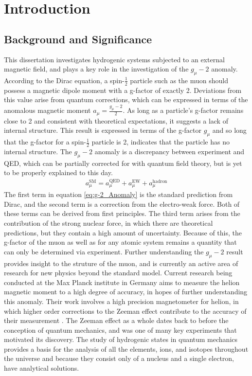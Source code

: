 \chapter{Introduction}
    \section{Background and Significance}
        This dissertation investigates hydrogenic systems subjected to an external magnetic field, and plays a key role in the investigation of the $g_\mu - 2$ anomaly. According to the Dirac equation, a spin-$\frac{1}{2}$ particle such as the muon should possess a magnetic dipole moment with a g-factor of exactly 2. Deviations from this value arise from quantum corrections, which can be expressed in terms of the anomalous magnetic moment $a_\mu = \frac{g_\mu-2}{2}$. As long as a particle's g-factor remains close to 2 and consistent with theoretical expectations, it suggests a lack of internal structure. This result is expressed in terms of the g-factor $g_\mu$ and so long that the g-factor for a spin-$\frac{1}{2}$ particle is 2, indicates that the particle has no internal structure. The $g_\mu - 2$ anomaly is a discrepancy between experiment and QED, which can be partially corrected for with quantum field theory, but is yet to be properly explained to this day.
        \begin{align}
            a_\mu^{\text{SM}} = a_\mu^{\text{QED}} + a_\mu^{\text{EW}} + a_\mu^{\text{hadron}}\label{eq:g-2_Anomaly}
        \end{align}
        The first term in equation \eqref{eq:g-2_Anomaly} is the standard prediction from Dirac, and the second term is a correction from the electro-weak force. Both of these terms can be derived from first principles. The third term arises from the contribution of the strong nuclear force, in which there are theoretical predictions, but they contain a high amount of uncertainty. Because of this, the g-factor of the muon as well as for any atomic system remains a quantity that can only be determined via experiment. Further understanding the $g_\mu - 2$ result provides insight to the struture of the muon, and is currently an active area of research for new physics beyond the standard model. Current research being conducted at the Max Planck institute in Germany aims to measure the helion magnetic moment to a high degree of accuracy, in hopes of further understanding this anomaly. Their work involves a high precision magnetometer for helion, in which higher order corrections to the Zeeman effect contribute to the accuracy of their measurement \cite{Schneider_Sikora_Dickopf_Müller_Oreshkina_Rischka_Valuev_Ulmer_Walz_Harman_et_al._2022}.
        The Zeeman effect as a whole dates back to before the conception of quantum mechanics, and was one of many key experiments that motivated its discovery. The study of hydrogenic states in quantum mechanics provides a basis for the analysis of all the elements, ions, and isotopes throughout the universe and because they consist only of a nucleus and a single electron, have analytical solutions.\\

